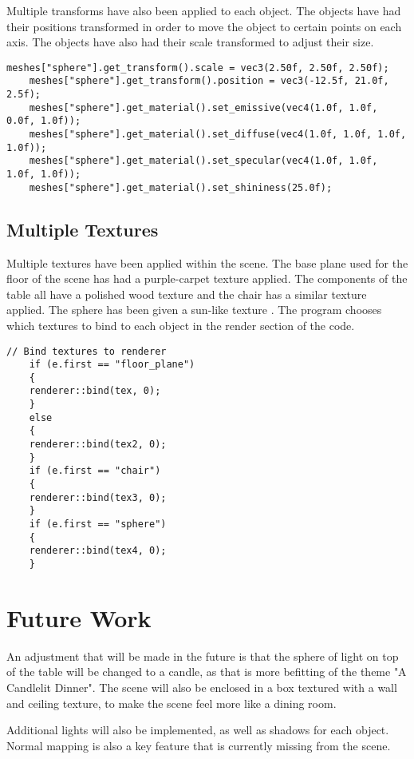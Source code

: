 \documentclass[10pt, a4paper]{article}
\begin{document}
	Multiple transforms have also been applied to each object. The objects have had their positions transformed in order to move the object to certain points on each axis. The objects have also had their scale transformed to adjust their size.
	
	\begin{lstlisting}[caption = Values set for the sphere object]
	meshes["sphere"].get_transform().scale = vec3(2.50f, 2.50f, 2.50f);
	meshes["sphere"].get_transform().position = vec3(-12.5f, 21.0f, 2.5f);
	meshes["sphere"].get_material().set_emissive(vec4(1.0f, 1.0f, 0.0f, 1.0f));
	meshes["sphere"].get_material().set_diffuse(vec4(1.0f, 1.0f, 1.0f, 1.0f));
	meshes["sphere"].get_material().set_specular(vec4(1.0f, 1.0f, 1.0f, 1.0f));
	meshes["sphere"].get_material().set_shininess(25.0f);
	\end{lstlisting}
	
	\subsection{Multiple Textures}
	Multiple textures have been applied within the scene. The base plane used for the floor of the scene has had a purple-carpet texture applied. The components of the table all have a polished wood texture and the chair has a similar texture applied. The sphere has been given a sun-like texture \cite{Sun}. The program chooses which textures to bind to each object in the render section of the code.
	
	\begin{lstlisting}[caption = If statements to decide which texture to use]
	// Bind textures to renderer
	if (e.first == "floor_plane")
	{
	renderer::bind(tex, 0);
	}
	else
	{
	renderer::bind(tex2, 0);
	}
	if (e.first == "chair")
	{
	renderer::bind(tex3, 0);
	}
	if (e.first == "sphere")
	{
	renderer::bind(tex4, 0);
	}
	\end{lstlisting}
 	
 	\section{Future Work}
 	An adjustment that will be made in the future is that the sphere of light on top of the table will be changed to a candle, as that is more befitting of the theme "A Candlelit Dinner". The scene will also be enclosed in a box textured with a wall and ceiling texture, to make the scene feel more like a dining room.
 	
 	Additional lights will also be implemented, as well as shadows for each object. Normal mapping is also a key feature that is currently missing from the scene.
 	
\end{document}
